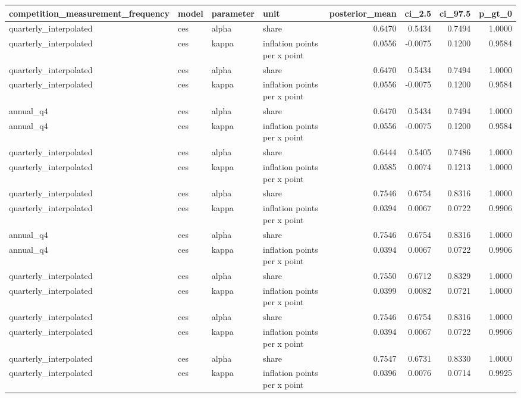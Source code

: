 \begin{tabular}{llllrrrr}
\toprule
competition\_measurement\_frequency & model & parameter & unit & posterior\_mean & ci\_2.5 & ci\_97.5 & p\_gt\_0 \\
\midrule
quarterly\_interpolated & ces & alpha & share & 0.6470 & 0.5434 & 0.7494 & 1.0000 \\
quarterly\_interpolated & ces & kappa & inflation points per x point & 0.0556 & -0.0075 & 0.1200 & 0.9584 \\
quarterly\_interpolated & ces & alpha & share & 0.6470 & 0.5434 & 0.7494 & 1.0000 \\
quarterly\_interpolated & ces & kappa & inflation points per x point & 0.0556 & -0.0075 & 0.1200 & 0.9584 \\
annual\_q4 & ces & alpha & share & 0.6470 & 0.5434 & 0.7494 & 1.0000 \\
annual\_q4 & ces & kappa & inflation points per x point & 0.0556 & -0.0075 & 0.1200 & 0.9584 \\
quarterly\_interpolated & ces & alpha & share & 0.6444 & 0.5405 & 0.7486 & 1.0000 \\
quarterly\_interpolated & ces & kappa & inflation points per x point & 0.0585 & 0.0074 & 0.1213 & 1.0000 \\
quarterly\_interpolated & ces & alpha & share & 0.7546 & 0.6754 & 0.8316 & 1.0000 \\
quarterly\_interpolated & ces & kappa & inflation points per x point & 0.0394 & 0.0067 & 0.0722 & 0.9906 \\
annual\_q4 & ces & alpha & share & 0.7546 & 0.6754 & 0.8316 & 1.0000 \\
annual\_q4 & ces & kappa & inflation points per x point & 0.0394 & 0.0067 & 0.0722 & 0.9906 \\
quarterly\_interpolated & ces & alpha & share & 0.7550 & 0.6712 & 0.8329 & 1.0000 \\
quarterly\_interpolated & ces & kappa & inflation points per x point & 0.0399 & 0.0082 & 0.0721 & 1.0000 \\
quarterly\_interpolated & ces & alpha & share & 0.7546 & 0.6754 & 0.8316 & 1.0000 \\
quarterly\_interpolated & ces & kappa & inflation points per x point & 0.0394 & 0.0067 & 0.0722 & 0.9906 \\
quarterly\_interpolated & ces & alpha & share & 0.7547 & 0.6731 & 0.8330 & 1.0000 \\
quarterly\_interpolated & ces & kappa & inflation points per x point & 0.0396 & 0.0076 & 0.0714 & 0.9925 \\

\end{tabular}
